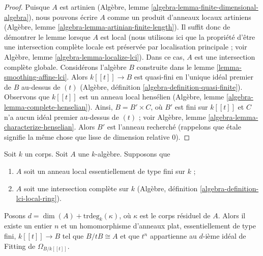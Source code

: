 \begin{proof}
Puisque $A$ est artinien
(Algèbre, lemme \ref{algebra-lemma-finite-dimensional-algebra}),
nous pouvons écrire $A$ comme un produit d'anneaux locaux artiniens
(Algèbre, lemme \ref{algebra-lemma-artinian-finite-length}).
Il suffit donc de démontrer le lemme lorsque $A$ est local
(nous utilisons ici que la propriété d'être une intersection complète locale
est préservée par localisation principale ; voir
Algèbre, lemme \ref{algebra-lemma-localize-lci}).
Dans ce cas, $A$ est une intersection complète globale.
Considérons l'algèbre $B$ construite dans le
lemme \ref{lemma-smoothing-affine-lci}.
Alors $k[[t]] \to B$ est quasi-fini en l'unique idéal premier de $B$
au-dessus de $(t)$ (Algèbre, définition \ref{algebra-definition-quasi-finite}).
Observons que $k[[t]]$ est un anneau local hensélien
(Algèbre, lemme \ref{algebra-lemma-complete-henselian}).
Ainsi, $B = B' \times C$, où $B'$ est fini sur $k[[t]]$
et $C$ n'a aucun idéal premier au-dessus de $(t)$ ; voir
Algèbre, lemme \ref{algebra-lemma-characterize-henselian}.
Alors $B'$ est l'anneau recherché
(rappelons que \'etale signifie la même chose que
lisse de dimension relative $0$).
\end{proof}

\begin{lemma}
\label{lemma-smoothing-at-lci-point}
Soit $k$ un corps. Soit $A$ une $k$-algèbre. Supposons que
\begin{enumerate}
\item $A$ soit un anneau local essentiellement de type fini sur $k$ ;
\item $A$ soit une intersection complète sur $k$
(Algèbre, définition \ref{algebra-definition-lci-local-ring}).
\end{enumerate}
Posons $d = \dim(A) + \text{trdeg}_k(\kappa)$, où $\kappa$
est le corps résiduel de $A$. Alors il existe un entier $n$
et un homomorphisme d'anneaux plat, essentiellement de type fini,
$k[[t]] \to B$ tel que $B/tB \cong A$ et que $t^n$ appartienne au
$d$-ième idéal de Fitting de $\Omega_{B/k[[t]]}$.
\end{lemma}

